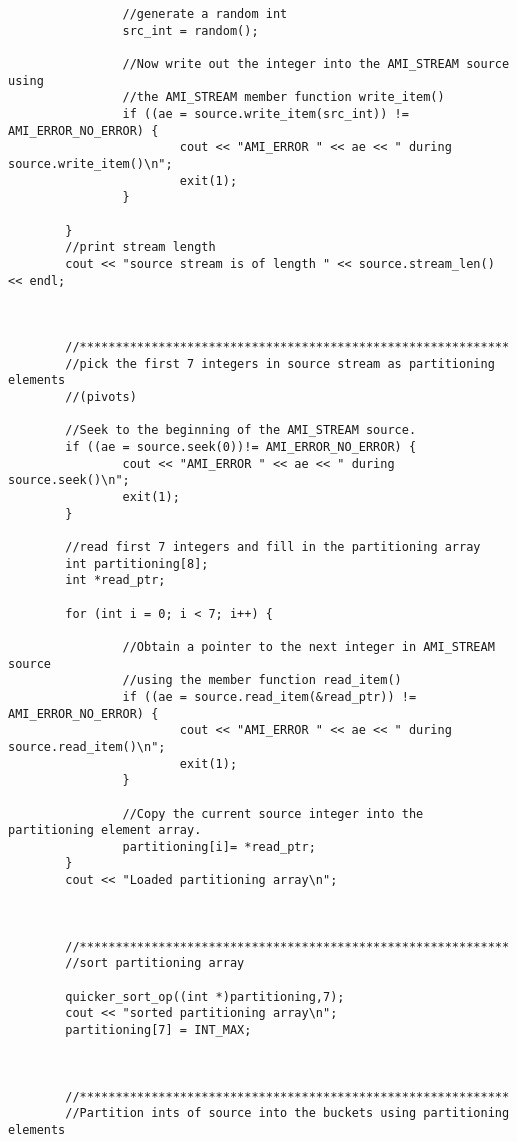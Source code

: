 \begin{verbatim}
                //generate a random int
                src_int = random();
                
                //Now write out the integer into the AMI_STREAM source using 
                //the AMI_STREAM member function write_item()
                if ((ae = source.write_item(src_int)) != AMI_ERROR_NO_ERROR) {
                        cout << "AMI_ERROR " << ae << " during source.write_item()\n";
                        exit(1);
                }
                
        }
        //print stream length
        cout << "source stream is of length " << source.stream_len() << endl;
        
        

        //************************************************************
        //pick the first 7 integers in source stream as partitioning elements
        //(pivots)
        
        //Seek to the beginning of the AMI_STREAM source.
        if ((ae = source.seek(0))!= AMI_ERROR_NO_ERROR) {
                cout << "AMI_ERROR " << ae << " during source.seek()\n";
                exit(1);
        }
        
        //read first 7 integers and fill in the partitioning array
        int partitioning[8];
        int *read_ptr;
        
        for (int i = 0; i < 7; i++) {
                
                //Obtain a pointer to the next integer in AMI_STREAM source
                //using the member function read_item()
                if ((ae = source.read_item(&read_ptr)) != AMI_ERROR_NO_ERROR) {
                        cout << "AMI_ERROR " << ae << " during source.read_item()\n";
                        exit(1);
                }
                
                //Copy the current source integer into the partitioning element array.
                partitioning[i]= *read_ptr;
        }
        cout << "Loaded partitioning array\n";



        //************************************************************
        //sort partitioning array
        
        quicker_sort_op((int *)partitioning,7);
        cout << "sorted partitioning array\n";
        partitioning[7] = INT_MAX;



        //************************************************************
        //Partition ints of source into the buckets using partitioning elements
        

\end{verbatim}
